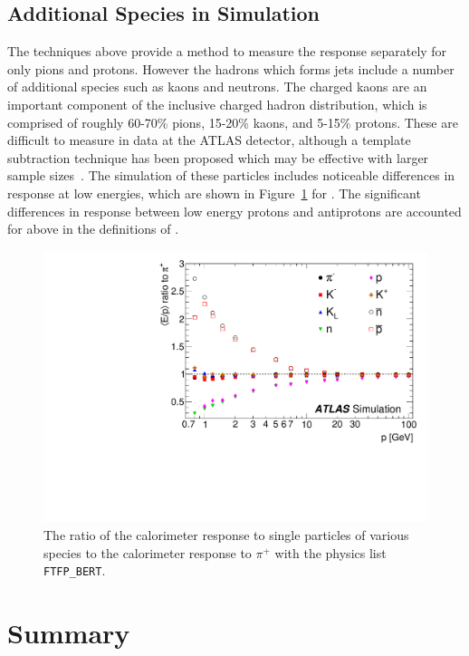 \subsection{Additional Species in Simulation}

The techniques above provide a method to measure the response separately for only pions and protons. 
However the hadrons which forms jets include a number of additional species such as kaons and neutrons. 
The charged kaons are an important component of the inclusive charged hadron distribution, which is comprised of roughly 60-70\% pions, 15-20\% kaons, and 5-15\% protons.
These are difficult to measure in data at the ATLAS detector, although a template subtraction technique has been proposed which may be effective with larger sample sizes~\cite{PERF-2015-05}.
The simulation of these particles includes noticeable differences in response at low energies, which are shown in Figure~\ref{fig:simulated_response} for \FTFP.
The significant differences in response between low energy protons and antiprotons are accounted for above in the definitions of \Ea. 

\begin{figure}[htbp]
\centering
\includegraphics[width=\fullfig]{figures/simulated_response.pdf}
\caption{The ratio of the calorimeter response to single particles of various species to the calorimeter response to $\pi^+$ with the physics list \texttt{FTFP\_BERT}.}
\label{fig:simulated_response}
\end{figure}


\section{Summary}

